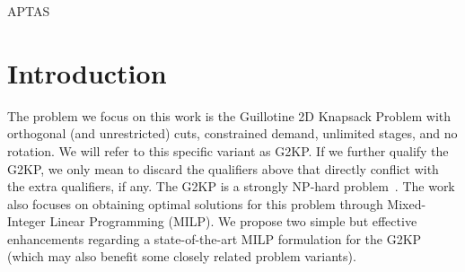 \documentclass[ppgc,prop-tese,english,formais,babel]{iiufrgs}
\begin{document}

\listoftables

\begin{listofabbrv}{APTAS}

\end{listofabbrv}


\tableofcontents


\chapter{Introduction}

The problem we focus on this work is the Guillotine 2D Knapsack Problem with orthogonal (and unrestricted) cuts, constrained demand, unlimited stages, and no rotation.
We will refer to this specific variant as G2KP.
If we further qualify the G2KP, we only mean to discard the qualifiers above that directly conflict with the extra qualifiers, if any.
The G2KP is a strongly NP-hard problem~\citep{russo:2020}.
The work also focuses on obtaining optimal solutions for this problem through Mixed-Integer Linear Programming (MILP).
We propose two simple but effective enhancements regarding a state-of-the-art MILP formulation for the G2KP (which may also benefit some closely related problem variants).
\end{document}
